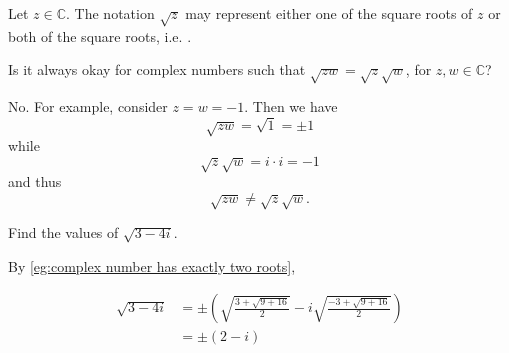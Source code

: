 \documentclass[11pt, oneside]{book}
\begin{document}
\begin{remark}
	Let $z \in \mathbb{C}$. The notation $\sqrt{z}$ may represent either one of the square roots of $z$ or both of the square roots, i.e. .
\end{remark}

\begin{ex}\label{ex:Separation of Multiplication in Square Roots}
	Is it always okay for complex numbers such that $\sqrt{zw} = \sqrt{z} \sqrt{w}$, for $z, w \in \mathbb{C}$?

	No. For example, consider $z = w = -1$. Then we have
	\begin{equation*}
		\sqrt{zw} = \sqrt{1} = \pm 1
	\end{equation*}
	while
	\begin{equation*}
		\sqrt{z} \sqrt{w} = i \cdot i = -1
	\end{equation*}
	and thus
	\begin{equation*}
		\sqrt{zw} \neq \sqrt{z} \sqrt{w}.
	\end{equation*}
\end{ex}

\begin{eg}
	Find the values of $\sqrt{3 - 4i}$.

	By \cref{eg:complex number has exactly two roots},

	\begin{align*}
		\sqrt{3 - 4i} &= \pm \left( \sqrt{\frac{3 + \sqrt{9 + 16}}{2}} - i \sqrt{\frac{-3 + \sqrt{9 + 16}}{2}} \right) \\
			&= \pm (2 - i)
	\end{align*}
\end{eg}
\end{document}
